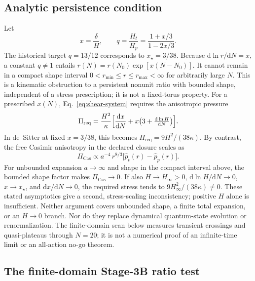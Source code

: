\documentclass[aps,prd,reprint,superscriptaddress,nofootinbib,floatfix,showkeys]{revtex4-2}
\newcommand{\Ht}{H_{t}}
\newcommand{\Hp}{H_{p}}
\begin{document}
\subsection{Analytic persistence condition}

Let
\begin{equation}
 x=\frac{\delta}{H},\qquad
 q=\frac{\Ht}{\Hp}=\frac{1+x/3}{1-2x/3}.
 \label{eq:q-x}
\end{equation}
The historical target \(q=13/12\) corresponds to \(x_\star=3/38\).
Because \(\mathrm{d}\ln r/\mathrm{d}N=x\), a constant \(q\neq 1\) entails
\(r(N)=r(N_0)\exp[x(N-N_0)]\). It cannot remain in a compact shape interval
\(0<r_{\min}\le r\le r_{\max}<\infty\) for arbitrarily large \(N\).
This is a kinematic obstruction to a persistent nonunit ratio with bounded
shape, independent of a stress prescription; it is not a fixed-torus property.
For a prescribed \(x(N)\), Eq.~\eqref{eq:shear-system} requires the
anisotropic pressure
\begin{equation}
 \Pi_{\mathrm{req}}=\frac{H^2}{\kappa}
 \Bigl[\frac{\mathrm{d}x}{\mathrm{d}N}
 +x\bigl(3+\tfrac{\mathrm{d}\ln H}{\mathrm{d}N}\bigr)\Bigr].
 \label{eq:required-stress}
\end{equation}
In de~Sitter at fixed \(x=3/38\), this becomes
\(\Pi_{\mathrm{req}}=9H^2/(38\kappa)\).  By contrast, the free Casimir
anisotropy in the declared closure scales as
\begin{equation}
 \Pi_{\mathrm{Cas}}\propto a^{-4}\,r^{8/3}
 \bigl[\widehat p_t(r)-\widehat p_p(r)\bigr].
 \label{eq:casimir-stress-scaling}
\end{equation}
For unbounded expansion \(a\to\infty\) and shape in the compact interval
above, the bounded shape factor makes \(\Pi_{\mathrm{Cas}}\to0\).
If also \(H\to H_\infty>0\),
\(\mathrm{d}\ln H/\mathrm{d}N\to0\), \(x\to x_\star\), and
\(\mathrm{d}x/\mathrm{d}N\to0\), the required stress tends to
\(9H_\infty^2/(38\kappa)\ne0\). These stated asymptotics give a second,
stress-scaling inconsistency; positive \(H\) alone is insufficient.
Neither argument covers unbounded shape, a finite total expansion, or an
\(H\to0\) branch. Nor do they replace dynamical quantum-state evolution or
renormalization. The finite-domain scan below measures transient crossings
and quasi-plateaus through \(N=20\); it is not a numerical proof of an
infinite-time limit or an all-action no-go theorem.

\subsection{The finite-domain Stage-3B ratio test}
\end{document}
